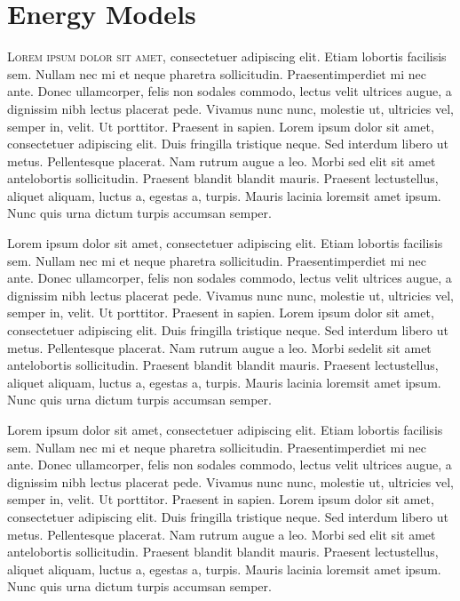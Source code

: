 \chapter{Energy Models}
\lettrine{L}{orem ipsum dolor sit amet}, consectetuer adipiscing elit. Etiam lobortis facilisis sem. Nullam nec mi et neque pharetra sollicitudin. Praesentimperdiet mi nec ante. Donec ullamcorper, felis non sodales commodo, lectus velit ultrices augue, a dignissim nibh lectus placerat pede. Vivamus nunc nunc, molestie ut, ultricies vel, semper in, velit. Ut porttitor. Praesent in sapien. Lorem ipsum dolor sit amet, consectetuer adipiscing elit. Duis fringilla tristique neque. Sed interdum libero ut metus. Pellentesque placerat. Nam rutrum augue a leo. Morbi sed elit sit amet antelobortis sollicitudin. Praesent blandit blandit mauris. Praesent lectustellus, aliquet aliquam, luctus a, egestas a, turpis. Mauris lacinia loremsit amet ipsum. Nunc quis urna dictum turpis accumsan semper.

Lorem ipsum dolor sit amet, consectetuer adipiscing elit. Etiam lobortis facilisis sem. Nullam nec mi et neque pharetra sollicitudin. Praesentimperdiet mi nec ante. Donec ullamcorper, felis non sodales commodo, lectus velit ultrices augue, a dignissim nibh lectus placerat pede. Vivamus nunc nunc, molestie ut, ultricies vel, semper in, velit. Ut porttitor. Praesent in sapien. Lorem ipsum dolor sit amet, consectetuer adipiscing elit. Duis fringilla tristique neque. Sed interdum libero ut metus. Pellentesque placerat. Nam rutrum augue a leo. Morbi sedelit sit amet antelobortis sollicitudin. Praesent blandit blandit mauris. Praesent lectustellus, aliquet aliquam, luctus a, egestas a, turpis. Mauris lacinia loremsit amet ipsum. Nunc quis urna dictum turpis accumsan semper.

Lorem ipsum dolor sit amet, consectetuer adipiscing elit. Etiam lobortis facilisis sem. Nullam nec mi et neque pharetra sollicitudin. Praesentimperdiet mi nec ante. Donec ullamcorper, felis non sodales commodo, lectus velit ultrices augue, a dignissim nibh lectus placerat pede. Vivamus nunc nunc, molestie ut, ultricies vel, semper in, velit. Ut porttitor. Praesent in sapien. Lorem ipsum dolor sit amet, consectetuer adipiscing elit. Duis fringilla tristique neque. Sed interdum libero ut metus. Pellentesque placerat. Nam rutrum augue a leo. Morbi sed elit sit amet antelobortis sollicitudin. Praesent blandit blandit mauris. Praesent lectustellus, aliquet aliquam, luctus a, egestas a, turpis. Mauris lacinia loremsit amet ipsum. Nunc quis urna dictum turpis accumsan semper.

